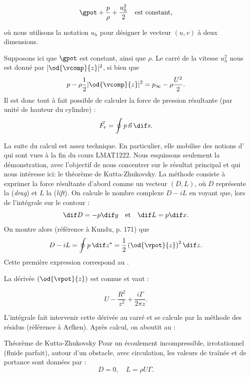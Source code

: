 \begin{displaymath}
\gpot + \frac{p}{\rho} + \frac{u_h^2}{2} \quad \text{est constant,}
\end{displaymath}

où nous utilisons la notation $u_h$ pour désigner le vecteur $(u,v)$ à deux dimensions.

Supposons ici que $\gpot$ est constant, ainsi que $\rho$. Le carré de la vitesse $u_h^2$ nous est donné par $|\od{\vcomp}{z}|^2$, si bien que
\[
p - \rho \frac{1}{2}|\od{\vcomp}{z}|^2 = p_\infty - \rho \frac{U^2}{2}.
\]
Il est donc tout à fait possible de calculer la force de pression résultante (par unité de hauteur du cylindre) :
\[
\vec{F_r} = \oint p\, \vec{n} \, \dif s.
\]

\begin{redmargin}
La suite du calcul est assez technique. En particulier, elle mobilise des notions d' qui sont vues à la fin du cours LMAT1222. Nous esquissons seulement la démonstration, avec l'objectif de nous concentrer sur le résultat principal et qui nous intéresse ici: le théorème de Kutta-Zhukovsky. 
La méthode consiste à exprimer la force résultante d'abord comme un vecteur $(D,L)$, où $D$ représente la  (\emph{drag}) et $L$ la  (\emph{lift}). On calcule le nombre complexe $D - iL$ en voyant que, lors de l'intégrale sur le contour :
\[
\dif D = -p \dif y \quad \text{et} \quad \dif L = p \dif x.
\]
On montre alors (référence à Kundu, p. 171) que
\[
D - iL = \oint p \, \dif z^\star = \frac{1}{2} \left(\od{\vpot}{z}\right)^2 \dif z.
\]
Cette première expression correspond au .

La dérivée $\left(\od{\vpot}{z}\right)$ est connue et vaut :

\begin{displaymath}
U - \frac{R^2}{z^2} + \frac{i\Gamma}{2\pi z}.
\end{displaymath}

L'intégrale fait intervenir cette dérivée au carré et se calcule par la méthode des résidus (référence à Arfken). Après calcul, on aboutit au  :
\end{redmargin}

\begin{key}{Théorème de Kutta-Zhukovsky}
Pour un écoulement incompressible, irrotationnel (fluide parfait), autour d'un obstacle, avec circulation, les valeurs de traînée et de portance sont données par :
\[
D = 0, \quad L = \rho U \Gamma.
\]
\end{key}


